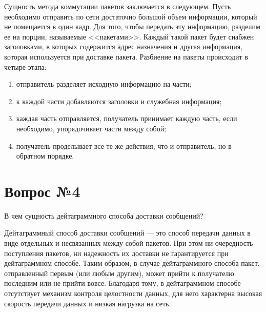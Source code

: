 \documentclass[a4paper, 14pt]{extarticle}
\begin{document}
Сущность метода коммутации пакетов заключается в следующем. Пусть необходимо
отправить по сети достаточно большой объем информации, который не помещается в
один кадр. Для того, чтобы передать эту информацию, разделим ее на порции,
называемые <<пакетами>>. Каждый такой пакет будет снабжен заголовками, в которых
содержится адрес назначения и другая информация, которая используется при
доставке пакета. Разбиение на пакеты происходит в четыре этапа:
\begin{enumerate}
  \item отправитель разделяет исходную информацию на части;
  \item к каждой части добавляются заголовки и служебная информация;
  \item каждая часть отправляется, получатель принимает каждую часть, если
  необходимо, упорядочивает части между собой;
  \item получатель проделывает все те же действия, что и отправитель, но в
  обратном порядке.
\end{enumerate}

\section*{Вопрос №4}

\begin{siderules}
  В чем сущность дейтаграммного способа доставки сообщений?
\end{siderules}

Дейтаграммный способ доставки сообщений --- это способ передачи данных в виде
отдельных и несвязанных между собой пакетов. При этом ни очередность поступления
пакетов, ни надежность их доставки не гарантируется при дейтаграммном способе.
Таким образом, в случае дейтаграммного способа пакет, отправленный первым (или
любым другим), может прийти к получателю последним или не прийти вовсе.
Благодаря тому, в дейтаграммном способе отсутствует механизм контроля
целостности данных, для него характерна высокая скорость передачи данных и
низкая нагрузка на сеть.
\end{document}
